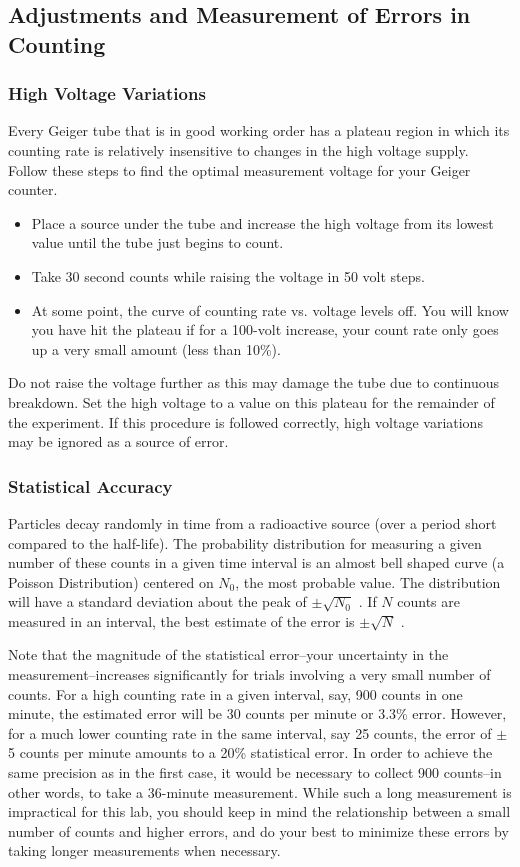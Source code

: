 \subsection{Adjustments and Measurement of Errors in Counting}
\subsubsection{High Voltage Variations}

Every Geiger tube that is in good working order has a plateau region in which its counting rate is relatively insensitive to changes in the high voltage supply. Follow these steps to find the optimal measurement voltage for your Geiger counter.
\begin{itemize}
  \item Place a source under the tube and increase the high voltage from its lowest value until the tube just begins to count.
  \item Take 30 second counts while raising the voltage in 50 volt steps.
  \item At some point, the curve of counting rate vs. voltage levels off. You will know you have hit the plateau if for a 100-volt increase, your count rate only goes up a very small amount (less than 10\%).
\end{itemize}
Do not raise the voltage further as this may damage the tube due to continuous breakdown. Set the high voltage to a value on this plateau for the remainder of the experiment. If this procedure is followed correctly, high voltage variations may be ignored as a source of error.

\subsubsection{Statistical Accuracy}

Particles decay randomly in time from a radioactive source (over a period short compared to the half-life). The probability distribution for measuring a given number of these counts in a given time interval is an almost bell shaped curve (a Poisson Distribution) centered on $N_0$, the most probable value. The distribution will have a standard deviation about the peak of $\pm \sqrt{N_{0}}$ . If $N$ counts are measured in an interval, the best estimate of the error is $\pm \sqrt{N}$ .\myskip

Note that the magnitude of the statistical error--your uncertainty in the measurement--increases significantly for trials involving a very small number of counts. For a high counting rate in a given interval, say, 900 counts in one minute, the estimated error will be 30 counts per minute or 3.3\% error. However, for a much lower counting rate in the same interval, say 25 counts, the error of $\pm$5 counts per minute amounts to a 20\% statistical error. In order to achieve the same precision as in the first case, it would be necessary to collect 900 counts--in other words, to take a 36-minute measurement. While such a long measurement is impractical for this lab, you should keep in mind the relationship between a small number of counts and higher errors, and do your best to minimize these errors by taking longer measurements when necessary.

